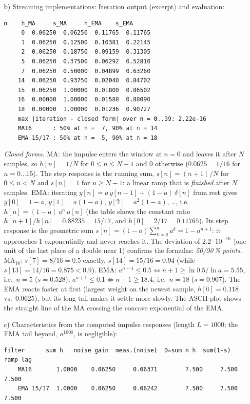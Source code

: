 \begin{solution}
b) Streaming implementations:
Iteration output (excerpt) and evaluation:
\begin{lstlisting}[style=shell,numbers=none]
     n    h_MA     s_MA     h_EMA    s_EMA
     0  0.06250  0.06250  0.11765  0.11765
     1  0.06250  0.12500  0.10381  0.22145
     2  0.06250  0.18750  0.09159  0.31305
     5  0.06250  0.37500  0.06292  0.52810
     7  0.06250  0.50000  0.04899  0.63260
    14  0.06250  0.93750  0.02040  0.84702
    15  0.06250  1.00000  0.01800  0.86502
    16  0.00000  1.00000  0.01588  0.88090
    18  0.00000  1.00000  0.01236  0.90727
    max |iteration - closed form| over n = 0..39: 2.22e-16
    MA16      : 50% at n =  7, 90% at n = 14
    EMA 15/17 : 50% at n =  5, 90% at n = 18
\end{lstlisting}
\emph{Closed forms.} MA: the impulse enters the window at $n=0$ and leaves it
after $N$ samples, so $h[n]=1/N$ for $0\le n\le N-1$ and 0 otherwise
($0.0625=1/16$ for $n=0\dots15$). The step response is the running sum,
$s[n]=(n+1)/N$ for $0\le n<N$ and $s[n]=1$ for $n\ge N-1$: a linear ramp that
is \emph{finished} after $N$ samples. EMA: iterating
$y[n]=a\,y[n-1]+(1-a)\,\delta[n]$ from rest gives $y[0]=1-a$, $y[1]=a(1-a)$,
$y[2]=a^2(1-a)$, \dots, i.e.\ $h[n]=(1-a)\,a^n\,u[n]$ (the table shows the
constant ratio $h[n+1]/h[n]=0.88235=15/17$, and $h[0]=2/17=0.11765$). Its step
response is the geometric sum $s[n]=(1-a)\sum_{k=0}^{n}a^k=1-a^{n+1}$: it
approaches 1 exponentially and never reaches it. The deviation of
$2.2\cdot10^{-16}$ (one unit of the last place of a double near 1) confirms
the formulas:
\emph{50/90\,\% points.} MA$_{16}$: $s[7]=8/16=0.5$ exactly, $s[14]=15/16=0.94$
(while $s[13]=14/16=0.875<0.9$). EMA: $a^{n+1}\le0.5\Leftrightarrow
n+1\ge\ln0.5/\ln a=5.55$, i.e.\ $n=5$ ($s=0.528$); $a^{n+1}\le0.1
\Leftrightarrow n+1\ge18.4$, i.e.\ $n=18$ ($s=0.907$). The EMA reacts
faster at first (largest weight on the newest sample, $h[0]=0.118$ vs.\ $0.0625$),
but its long tail makes it settle more slowly. The ASCII plot shows the
straight line of the MA crossing the concave exponential of the EMA.

c) Characteristics from the computed impulse responses
(length $L=1000$; the EMA tail beyond, $a^{1000}$, is negligible):
\begin{lstlisting}[style=shell,numbers=none]
    filter      sum h   noise gain  meas.(noise)  D=sum n h  sum(1-s)  ramp lag
    MA16       1.0000    0.06250     0.06371        7.500     7.500     7.500
    EMA 15/17  1.0000    0.06250     0.06242        7.500     7.500     7.500


\end{lstlisting}
\end{solution}
